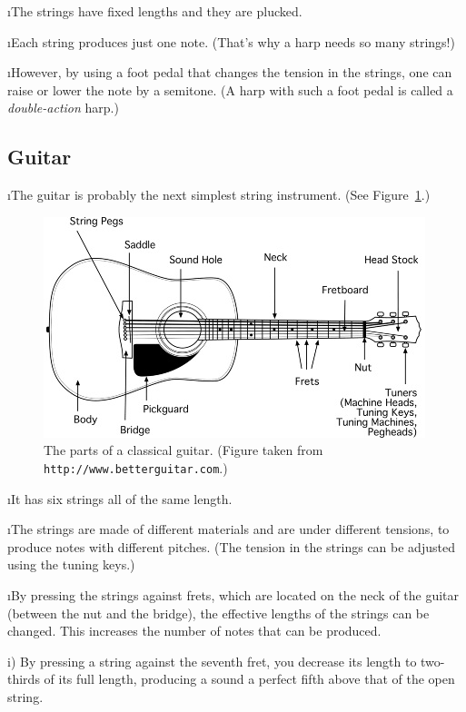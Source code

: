 \i The strings have fixed lengths and they are 
plucked.

\i Each string produces just one note.
(That's why a harp needs so many strings!)

\i However, by using a foot pedal that changes
the tension in the strings, one can raise or 
lower the note by a semitone.
(A harp with such a foot pedal is called a 
{\em double-action} harp.)

\ei
\subsection{Guitar}
\bi

\i The guitar is probably the next simplest string
instrument.
(See Figure~\ref{f:guitar}.)
%
\begin{figure}[htbp]
\begin{center}
\includegraphics[width=.9\textwidth]{guitar.jpg}
\caption{The parts of a classical guitar.
(Figure taken from {\tt http://www.betterguitar.com}.)}
\label{f:guitar}
\end{center}
\end{figure}

\i It has six strings all of the same length.

\i The strings are made of different materials 
and are under different tensions, to produce notes 
with different pitches.
(The tension in the strings can be adjusted 
using the tuning keys.)

\i By pressing the strings against frets, which
are located on the neck of the guitar (between the
nut and the bridge), the effective lengths of 
the strings can be changed.
This increases the number of notes that can be 
produced.

i) By pressing a string against the seventh fret,
you decrease its length to two-thirds of its full 
length, producing a sound a perfect fifth above
that of the open string.

